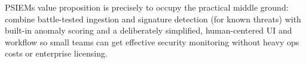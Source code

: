 PSIEMs value proposition is precisely to occupy the practical middle ground: combine battle-tested ingestion and signature detection (for known threats) with built-in anomaly scoring and a deliberately simplified, human-centered UI and workflow so small teams can get effective security monitoring without heavy ops costs or enterprise licensing.